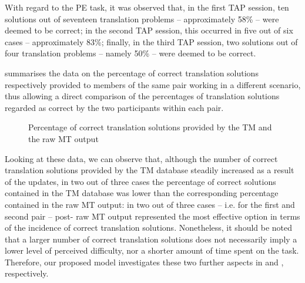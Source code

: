 \documentclass[output=paper]{LSP/langsci}
\begin{document}
\largerpage
With regard to the PE task, it was observed that, in the first TAP session, ten solutions out of seventeen translation problems -- approximately 58\% -- were deemed to be correct; in the second TAP session, this occurred in five out of six cases -- approximately 83\%; finally, in the third TAP session, two solutions out of four translation problems -- namely 50\% -- were deemed to be correct.


  
 summarises the data on the percentage of correct translation solutions respectively provided to members of the same pair working in a different scenario, thus allowing a direct comparison of the percentages of translation solutions regarded as correct by the two participants within each pair.

\begin{figure}
\caption{Percentage of correct translation solutions provided by the TM and the raw MT output}
\label{rossetti-gaspari:fig:1}
\end{figure}


Looking at these data, we can observe that, although the number of correct translation solutions provided by the TM database steadily increased as a result of the updates, in two out of three cases the percentage of correct solutions contained in the TM database was lower than the corresponding percentage contained in the raw MT output: in two out of three cases -- i.e. for the first and second pair -- post- raw MT output represented the most effective option in terms of the incidence of correct translation solutions. Nonetheless, it should be noted that a larger number of correct translation solutions does not necessarily imply a lower level of perceived difficulty, nor a shorter amount of time spent on the task. Therefore, our proposed model investigates these two further aspects in  and , respectively.
\end{document}

